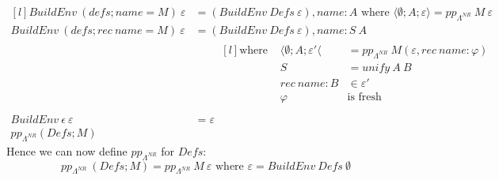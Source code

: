 \[\begin{matrix*}[l]
    BuildEnv \ (defs; name = M) \ \varepsilon & = (BuildEnv \ Defs \ \varepsilon), name: A \text{ where } \langle \emptyset ; A ; \varepsilon \rangle = pp_{\Lambda^{NR}} \ M \ \varepsilon \\
    BuildEnv \ (defs; rec \ name = M) \ \varepsilon & = (BuildEnv \ Defs \ \varepsilon), name : S \ A \\
    & \qquad \begin{matrix*}[l]
        \text{where } & \langle \emptyset ; A ; \varepsilon' \langle & = pp_{\Lambda^{NR}} \ M (\varepsilon, rec \ name: \varphi) \\
        & S &= unify \ A \ B \\
        & rec \ name: B & \in \varepsilon' \\
        & \varphi & \text{is fresh} \\
    \end{matrix*} \\
    BuildEnv \ \epsilon \ \varepsilon & = \varepsilon \\
    pp_{\Lambda^{NR}} (Defs ; M)
\end{matrix*}\]
Hence we can now define $pp_{\Lambda^{NR}}$ for $Defs$:
\[pp_{\Lambda^{NR}} \ (Defs; M) = pp_{\Lambda^{NR}} \ M \ \varepsilon \text{ where } \varepsilon = BuildEnv \ Defs \ \emptyset\]
